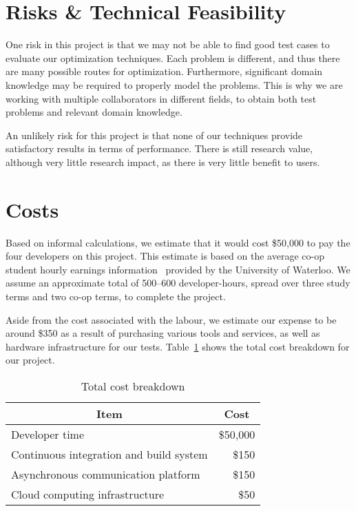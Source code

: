\documentclass[11pt]{article}
\begin{document}
\section{Risks \& Technical Feasibility}
One risk in this project is that we may not be able to find good test
cases to evaluate our optimization techniques. Each problem is
different, and thus there are many possible routes for optimization.
Furthermore, significant domain knowledge may be required to properly
model the problems. This is why we are working with multiple
collaborators in different fields, to obtain both test problems and
relevant domain knowledge.

An unlikely risk for this project is that none of our techniques
provide satisfactory results in terms of performance. There is still
research value, although very little research impact, as there is very
little benefit to users.

\section{Costs}
Based on informal calculations, we estimate that it would cost \$50,000
to pay the four developers on this project. This estimate is based on
the average co-op student hourly earnings information~\cite{ref:ceca}
provided by the University of Waterloo. We assume an approximate total
of 500--600 developer-hours, spread over three study terms and two
co-op terms, to complete the project.

Aside from the cost associated with the labour, we estimate our expense
to be around \$350 as a result of purchasing various tools and
services, as well as hardware infrastructure for our tests.
Table~\ref{tbl:costbreakdown} shows the total cost breakdown for our
project.

\begin{table}
  \captionsetup{margin=30pt}
  \caption{Total cost breakdown}\label{tbl:costbreakdown}
  \centering
  \begin{tabular}{lr}
    \hline
    \multicolumn{1}{c}{\textbf{Item}} &
    \multicolumn{1}{c}{\textbf{Cost}} \\
    \hline
      Developer time & \$50,000 \\
      Continuous integration and build system & \$150 \\
      Asynchronous communication platform & \$150 \\
      Cloud computing infrastructure & \$50 \\
  \end{tabular}
\end{table}
\end{document}

